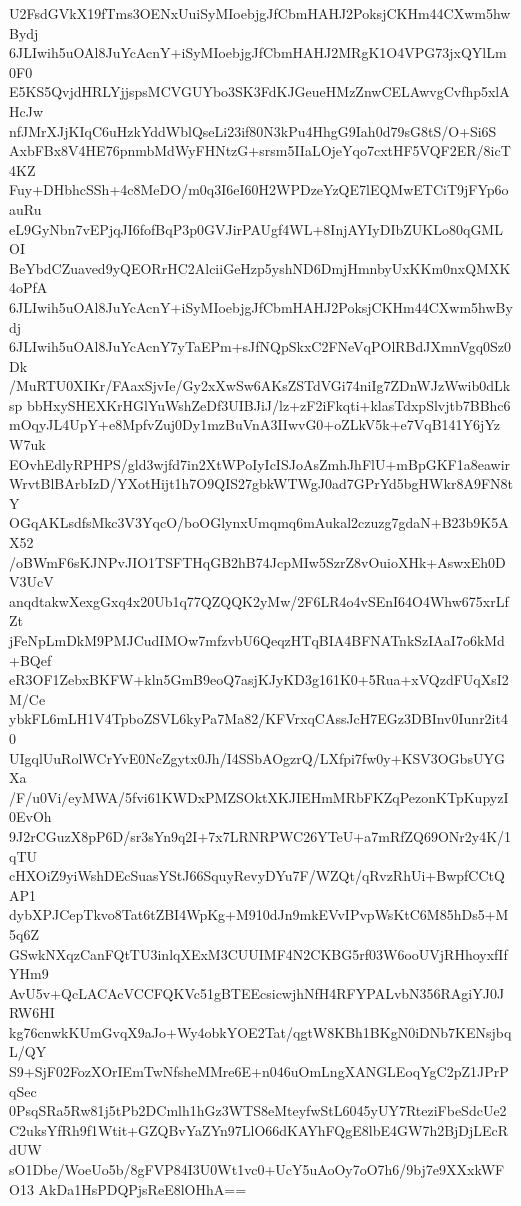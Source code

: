 U2FsdGVkX19fTms3OENxUuiSyMIoebjgJfCbmHAHJ2PoksjCKHm44CXwm5hwBydj
6JLIwih5uOAl8JuYcAcnY+iSyMIoebjgJfCbmHAHJ2MRgK1O4VPG73jxQYlLm0F0
E5KS5QvjdHRLYjjspsMCVGUYbo3SK3FdKJGeueHMzZnwCELAwvgCvfhp5xlAHcJw
nfJMrXJjKIqC6uHzkYddWblQseLi23if80N3kPu4HhgG9Iah0d79sG8tS/O+Si6S
AxbFBx8V4HE76pnmbMdWyFHNtzG+srsm5IIaLOjeYqo7cxtHF5VQF2ER/8icT4KZ
Fuy+DHbhcSSh+4c8MeDO/m0q3I6eI60H2WPDzeYzQE7lEQMwETCiT9jFYp6oauRu
eL9GyNbn7vEPjqJI6fofBqP3p0GVJirPAUgf4WL+8InjAYIyDIbZUKLo80qGMLOI
BeYbdCZuaved9yQEORrHC2AlciiGeHzp5yshND6DmjHmnbyUxKKm0nxQMXK4oPfA
6JLIwih5uOAl8JuYcAcnY+iSyMIoebjgJfCbmHAHJ2PoksjCKHm44CXwm5hwBydj
6JLIwih5uOAl8JuYcAcnY7yTaEPm+sJfNQpSkxC2FNeVqPOlRBdJXmnVgq0Sz0Dk
/MuRTU0XIKr/FAaxSjvIe/Gy2xXwSw6AKsZSTdVGi74niIg7ZDnWJzWwib0dLksp
bbHxySHEXKrHGlYuWshZeDf3UIBJiJ/lz+zF2iFkqti+klasTdxpSlvjtb7BBhc6
mOqyJL4UpY+e8MpfvZuj0Dy1mzBuVnA3IIwvG0+oZLkV5k+e7VqB141Y6jYzW7uk
EOvhEdlyRPHPS/gld3wjfd7in2XtWPoIyIcISJoAsZmhJhFlU+mBpGKF1a8eawir
WrvtBlBArbIzD/YXotHijt1h7O9QIS27gbkWTWgJ0ad7GPrYd5bgHWkr8A9FN8tY
OGqAKLsdfsMkc3V3YqcO/boOGlynxUmqmq6mAukal2czuzg7gdaN+B23b9K5AX52
/oBWmF6sKJNPvJIO1TSFTHqGB2hB74JcpMIw5SzrZ8vOuioXHk+AswxEh0DV3UcV
anqdtakwXexgGxq4x20Ub1q77QZQQK2yMw/2F6LR4o4vSEnI64O4Whw675xrLfZt
jFeNpLmDkM9PMJCudIMOw7mfzvbU6QeqzHTqBIA4BFNATnkSzIAaI7o6kMd+BQef
eR3OF1ZebxBKFW+kln5GmB9eoQ7asjKJyKD3g161K0+5Rua+xVQzdFUqXsI2M/Ce
ybkFL6mLH1V4TpboZSVL6kyPa7Ma82/KFVrxqCAssJcH7EGz3DBInv0Iunr2it40
UIgqlUuRolWCrYvE0NcZgytx0Jh/I4SSbAOgzrQ/LXfpi7fw0y+KSV3OGbsUYGXa
/F/u0Vi/eyMWA/5fvi61KWDxPMZSOktXKJIEHmMRbFKZqPezonKTpKupyzI0EvOh
9J2rCGuzX8pP6D/sr3sYn9q2I+7x7LRNRPWC26YTeU+a7mRfZQ69ONr2y4K/1qTU
cHXOiZ9yiWshDEcSuasYStJ66SquyRevyDYu7F/WZQt/qRvzRhUi+BwpfCCtQAP1
dybXPJCepTkvo8Tat6tZBI4WpKg+M910dJn9mkEVvIPvpWsKtC6M85hDs5+M5q6Z
GSwkNXqzCanFQtTU3inlqXExM3CUUIMF4N2CKBG5rf03W6ooUVjRHhoyxfIfYHm9
AvU5v+QcLACAcVCCFQKVc51gBTEEcsicwjhNfH4RFYPALvbN356RAgiYJ0JRW6HI
kg76cnwkKUmGvqX9aJo+Wy4obkYOE2Tat/qgtW8KBh1BKgN0iDNb7KENsjbqL/QY
S9+SjF02FozXOrIEmTwNfsheMMre6E+n046uOmLngXANGLEoqYgC2pZ1JPrPqSec
0PsqSRa5Rw81j5tPb2DCmlh1hGz3WTS8eMteyfwStL6045yUY7RteziFbeSdcUe2
C2uksYfRh9f1Wtit+GZQBvYaZYn97LlO66dKAYhFQgE8lbE4GW7h2BjDjLEcRdUW
sO1Dbe/WoeUo5b/8gFVP84I3U0Wt1vc0+UcY5uAoOy7oO7h6/9bj7e9XXxkWFO13
AkDa1HsPDQPjsReE8lOHhA==
